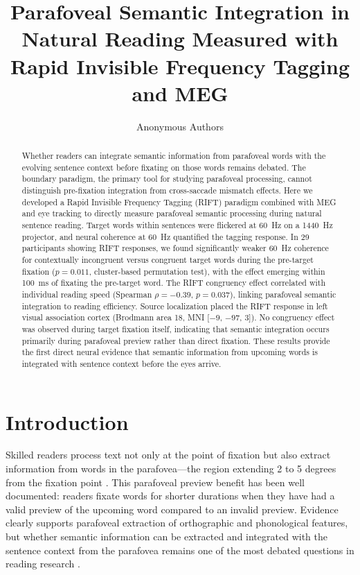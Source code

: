 \documentclass[12pt]{article}
\title{Parafoveal Semantic Integration in Natural Reading Measured with Rapid Invisible Frequency Tagging and MEG}
\author{Anonymous Authors}
\date{}
\begin{document}
\maketitle

\begin{abstract}
Whether readers can integrate semantic information from parafoveal words with the evolving sentence context before fixating on those words remains debated. The boundary paradigm, the primary tool for studying parafoveal processing, cannot distinguish pre-fixation integration from cross-saccade mismatch effects. Here we developed a Rapid Invisible Frequency Tagging (RIFT) paradigm combined with MEG and eye tracking to directly measure parafoveal semantic processing during natural sentence reading. Target words within sentences were flickered at 60~Hz on a 1440~Hz projector, and neural coherence at 60~Hz quantified the tagging response. In 29 participants showing RIFT responses, we found significantly weaker 60~Hz coherence for contextually incongruent versus congruent target words during the pre-target fixation ($p = 0.011$, cluster-based permutation test), with the effect emerging within 100~ms of fixating the pre-target word. The RIFT congruency effect correlated with individual reading speed (Spearman $\rho = -0.39$, $p = 0.037$), linking parafoveal semantic integration to reading efficiency. Source localization placed the RIFT response in left visual association cortex (Brodmann area 18, MNI [$-9$, $-97$, $3$]). No congruency effect was observed during target fixation itself, indicating that semantic integration occurs primarily during parafoveal preview rather than direct fixation. These results provide the first direct neural evidence that semantic information from upcoming words is integrated with sentence context before the eyes arrive.
\end{abstract}

\section{Introduction}

Skilled readers process text not only at the point of fixation but also extract information from words in the parafovea---the region extending 2 to 5 degrees from the fixation point \citep{rayner1998eye}. This parafoveal preview benefit has been well documented: readers fixate words for shorter durations when they have had a valid preview of the upcoming word compared to an invalid preview. Evidence clearly supports parafoveal extraction of orthographic and phonological features, but whether semantic information can be extracted and integrated with the sentence context from the parafovea remains one of the most debated questions in reading research \citep{schotter2012parafoveal}.
\end{document}
